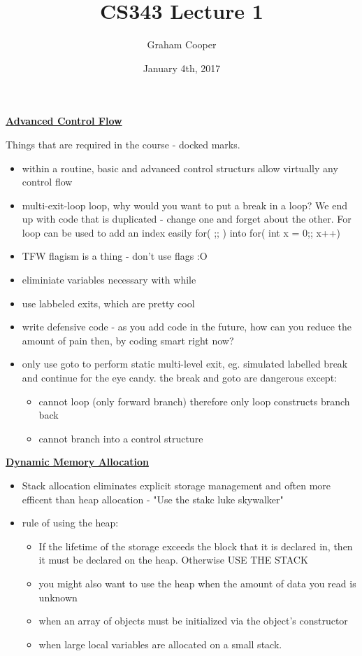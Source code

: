 \documentclass[12pt]{article}
\title{\vspace{-15ex}CS343 Lecture 1\vspace{-1ex}}
\date{January 4th, 2017}
\author{Graham Cooper}
\newcommand{\myt}[1]{\textbf{\underline{#1}}}
\begin{document}
	\maketitle
	
	\myt{Advanced Control Flow}
	
	Things that are required in the course - docked marks.\\
	\begin{itemize}
		\item within a routine, basic and advanced control structurs allow virtually any control flow
		\item multi-exit-loop loop, why would you want to put a break in a loop? We end up with code that is duplicated - change one and forget about the other. For loop can be used to add an index easily for( ;; ) into for( int x = 0;; x++)
		\item TFW flagism is a thing - don't use flags :O
		\item eliminiate variables necessary with while
		\item use labbeled exits, which are pretty cool
		\item write defensive code - as you add code in the future, how can you reduce the amount of pain then, by coding smart right now?
		\item only use goto to perform static multi-level exit, eg. simulated labelled break and continue for the eye candy. the break and goto are dangerous except:
		\begin{itemize}
			\item cannot loop (only forward branch) therefore only loop constructs branch back
			\item cannot branch into a control structure
		\end{itemize}
	\end{itemize}

	\myt{Dynamic Memory Allocation}
	
	\begin{itemize}
		\item Stack allocation eliminates explicit storage management and often more efficent than heap allocation - "Use the stakc luke skywalker"
		\item rule of using the heap: 
		\begin{itemize}
			\item If the lifetime of the storage exceeds the block that it is declared in, then it must be declared on the heap. Otherwise USE THE STACK
			\item you might also want to use the heap when the amount of data you read is unknown
			\item when an array of objects must be initialized via the object's constructor
			\item when large local variables are allocated on a small stack.
		\end{itemize}
	\end{itemize}
	
	
\end{document}
